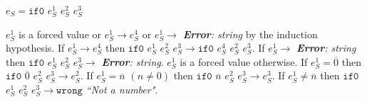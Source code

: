\begin{case}
$e_{S}=\mathtt{if0}$ $e_{S}^{1}$ $e_{S}^{2}$ $e_{S}^{3}$

$e_{S}^{1}$ is a forced value or $e_{S}^{1}\rightarrow e_{S}^{4}$ or $e_{S}^{1}\rightarrow$ \emph{\textbf{Error}: string} by the induction hypothesis.  If $e_{S}^{1}\rightarrow e_{S}^{4}$ then $\mathtt{if0}$ $e_{S}^{1}$ $e_{S}^{2}$ $e_{S}^{3}\rightarrow \mathtt{if0}$ $e_{S}^{4}$ $e_{S}^{2}$ $e_{S}^{3}$.  If $e_{S}^{1}\rightarrow$ \emph{\textbf{Error}: string} then $\mathtt{if0}$ $e_{S}^{1}$ $e_{S}^{2}$ $e_{S}^{3}\rightarrow$ \emph{\textbf{Error}: string}.  $e_{S}^{1}$ is a forced value otherwise.  If $e_{S}^{1}=\overline{0}$ then $\mathtt{if0}$ $\overline{0}$ $e_{S}^{2}$ $e_{S}^{3}\rightarrow e_{S}^{2}$.  If $e_{S}^{1}=\overline{n}$ $(n\neq 0)$ then $\mathtt{if0}$ $\overline{n}$ $e_{S}^{2}$ $e_{S}^{3}\rightarrow e_{S}^{3}$.  If $e_{S}^{1}\neq\overline{n}$ then $\mathtt{if0}$ $e_{S}^{1}$ $e_{S}^{2}$ $e_{S}^{3}\rightarrow\mathtt{wrong}$ \emph{``Not a number"}.
\end{case}